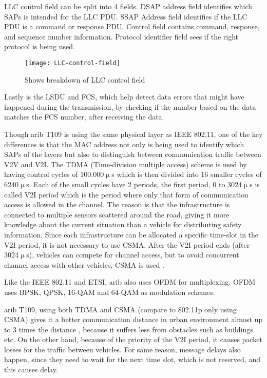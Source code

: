 \acrshort{LLC} control field can be split into 4 fields. \acrfull{DSAP} address field identifies which \acrshort{SAP}s is intended for the \acrshort{LLC} \acrshort{PDU}. \acrfull{SSAP} Address field identifies if the \acrshort{LLC} \acrshort{PDU} is a command or response \acrshort{PDU}. Control field contains command, response, and sequence number information. Protocol identifier field sees if the right protocol is being used.
\begin{figure}[h]
    \centering
    \texttt{[image: LLC-control-field]}
    \caption{Shows breakdown of \acrshort{LLC} control field}
    \label{fig:LLC}
\end{figure}
Lastly is the \acrshort{LSDU} and \acrshort{FCS}, which help detect data errors that might have happened during the transmission, by checking if the number based on the data matches the \acrshort{FCS} number, after receiving the data. 
\par
% 
Though \acrshort{arib} T109 is using the same physical layer as \acrshort{IEEE} 802.11, one of the key differences is that the \acrshort{MAC} address not only is being used to identify which \acrshort{SAP}s of the layers but also to distinguish between communication traffic between \acrshort{V2V} and \acrshort{V2I}. The \acrshort{TDMA} (Time-division multiple access) scheme is used by having control cycles of 100.000$\upmu$s which is then divided into 16 smaller cycles of  6240$\upmu$s. Each of the small cycles have 2 periods, the first period, 0 to 3024$\upmu$s is called V2I period which is the period where only that form of communication access is allowed in the channel. The reason is that the infrastructure is connected to multiple sensors scattered around the road, giving it more knowledge about the current situation than a vehicle for distributing safety information. Since each infrastructure can be allocated a specific time-slot in the V2I period, it is not necessary to use \acrshort{CSMA}. After the \acrshort{V2I} period ends (after 3024$\upmu$s), vehicles can compete for channel access, but to avoid concurrent channel access with other vehicles, \acrshort{CSMA} is used \cite{Heinovski2016PerformanceSTD-T109}.\par
% 
Like the \acrshort{IEEE} 802.11 and \acrshort{ETSI}, \acrshort{arib} also uses \acrshort{OFDM} for multiplexing. \acrshort{OFDM} uses \acrshort{BPSK}, \acrshort{QPSK}, 16-QAM and 64-QAM as modulation schemes\footnotemark.\par
% 
% 
\acrshort{arib} T109, using both \acrshort{TDMA} and \acrshort{CSMA} (compare to 802.11p only using \acrshort{CSMA}) gives it a better communication distance in urban environment almost up to 3 times the distance \cite{Heinovski2016PerformanceSTD-T109}, because it suffers less from obstacles such as buildings etc. On the other hand, because of the priority of the \acrshort{V2I} period, it causes packet losses for the traffic between vehicles. For same reason, message delays also happen, since they need to wait for the next time slot, which is not reserved, and this causes delay. 